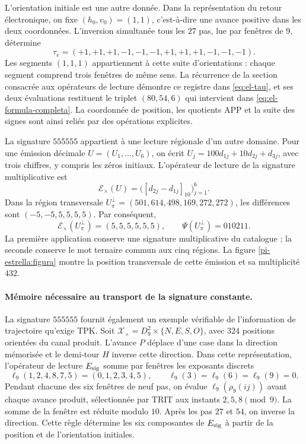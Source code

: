 L'orientation initiale est une autre donnée. Dans la représentation du
retour électronique, on fixe \((h_0,v_0)=(1,1)\), c'est-à-dire une avance
positive dans les deux coordonnées. L'inversion simultanée tous les \(27\)
pas, lue par fenêtres de \(9\), détermine
\[
 \tau_e=(+1,+1,+1,-1,-1,-1,+1,+1,+1,-1,-1,-1).
\]
Les segments \((1,1,1)\) appartiennent à cette suite d'orientations :
chaque segment comprend trois fenêtres de même sens. La récurrence
de la section consacrée aux opérateurs de lecture démontre ce registre dans
\eqref{eq:el-tau}, et ses deux évaluations restituent le triplet
\((80,54,6)\) qui intervient dans
\eqref{eq:el-formula-completa}. La coordonnée de position, les
quotients APP et la suite des signes sont ainsi reliés par
des opérations explicites.

La signature \(555555\) appartient à une lecture régionale d'un autre
domaine. Pour une émission décimale \(U=(U_1,\ldots,U_6)\), on écrit
\(U_j=100d_{1j}+10d_{2j}+d_{3j}\), avec trois chiffres, y compris les
zéros initiaux. L'opérateur de lecture de la signature multiplicative est
\[
 \mathcal E_\times(U)
   =\bigl([d_{2j}-d_{1j}]_{10}\bigr)_{j=1}^{6}.
\]
Dans la région transversale
\(U_\pi^\perp=(501,614,498,169,272,272)\), les différences sont
\((-5,-5,5,5,5,5)\). Par conséquent,
\begin{equation}
 \mathcal E_\times(U_\pi^\perp)=(5,5,5,5,5,5),\qquad
 \Psi(U_\pi^\perp)=010211.
 \label{el-centro:firma-transversal}
\end{equation}
La première application conserve une signature multiplicative du catalogue ;
la seconde conserve le mot ternaire commun aux cinq régions.
La figure \ref{pi-estrella:figura} montre la position transversale de
cette émission et sa multiplicité \(432\).

\paragraph{Mémoire nécessaire au transport de la signature constante.}
La signature \(555555\) fournit également un exemple vérifiable de
l'information de trajectoire qu'exige TPK. Soit
\(\mathcal X_\times=D_9^2\times\{N,E,S,O\}\), avec \(324\)
positions orientées du canal produit. L'avance \(P\) déplace
d'une case dans la direction mémorisée et le demi-tour \(H\)
inverse cette direction. Dans cette représentation, l'opérateur de lecture
\(E_{\rm sig}\) somme par fenêtres les exposants discrets
\[
 \ell_9(1,2,4,8,7,5)=(0,1,2,3,4,5),\qquad
 \ell_9(3)=\ell_9(6)=\ell_9(9)=0.
\]
Pendant chacune des six fenêtres de neuf pas, on évalue
\(\ell_9(\rho_9(ij))\) avant chaque avance produit, sélectionnée
par TRIT aux instants \(2,5,8\pmod9\). La somme de la fenêtre est
réduite modulo \(10\). Après les pas \(27\) et \(54\), on inverse
la direction. Cette règle détermine les six composantes de
\(E_{\rm sig}\) à partir de la position et de l'orientation initiales.

